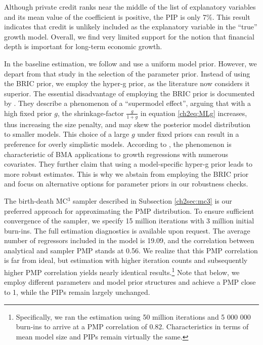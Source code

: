 \begin{refsection}
Although private credit ranks near the middle of the list of explanatory variables and its mean value of the coefficient is positive, the \ac{PIP} is only 7\%. This result indicates that credit is unlikely included as the explanatory variable in the ``true'' growth model. Overall, we find very limited support for the notion that financial depth is important for long-term economic growth.

In the baseline estimation, we follow \textcite{Fernandezetal2001} and use a uniform model prior. However, we depart from that study in the selection of the parameter prior. Instead of using the \ac{BRIC} prior, we employ the hyper-g prior, as the literature now considers it superior. The essential disadvantage of employing the \ac{BRIC} prior is documented by \textcite{FeldkircherZeugner2009}. They describe a phenomenon of a ``supermodel effect'', arguing that with a high fixed prior $g$, the shrinkage-factor $\frac{g}{1+g}$ in equation \ref{ch2eq:MLg} increases, thus increasing the size penalty, and may skew the posterior model distribution to smaller models. This choice of a large $g$ under fixed priors can result in a preference for overly simplistic models. According to \textcite{FeldkircherZeugner2009}, the phenomenon is characteristic of \ac{BMA} applications to growth regressions with numerous covariates. They further claim that using a model-specific hyper-g prior leads to more robust estimates. This is why we abstain from employing the \ac{BRIC} prior and focus on alternative options for parameter priors in our robustness checks.

The birth-death MC$^{3}$ sampler described in Subsection \ref{ch2sec:mc3} is our preferred approach for approximating the \ac{PMP} distribution. To ensure sufficient convergence of the sampler, we specify 15 million iterations with 3 million  initial burn-ins. The full estimation diagnostics is available upon request. The average number of regressors included in the model is 19.09, and the correlation between analytical and sampler \ac{PMP} stands at 0.56. We realize that this \ac{PMP} correlation is far from ideal, but estimation with higher iteration counts and subsequently higher \ac{PMP} correlation yields nearly identical results.\footnote{Specifically, we ran the estimation using 50 million iterations and 5 000 000 burn-ins to arrive at a \ac{PMP} correlation of 0.82. Characteristics in terms of mean model size and \acp{PIP} remain virtually the same.} Note that below, we employ different parameters and model prior structures and achieve a \ac{PMP} close to 1, while the \acp{PIP} remain largely unchanged. 


\end{refsection}
